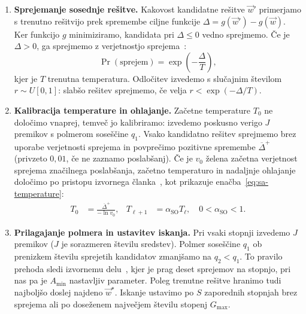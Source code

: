 \documentclass[9pt]{style/friteza}
\begin{document}
\begin{enumerate}
    \item \textbf{Sprejemanje sosednje rešitve.}
    Kakovost kandidatne rešitve $\vec{w}'$ primerjamo s trenutno rešitvijo prek spremembe ciljne funkcije $\Delta=g(\vec{w}')-g(\vec{w})$. Ker funkcijo $g$ minimiziramo, kandidata pri $\Delta\leq0$ vedno sprejmemo. Če je $\Delta>0$, ga sprejmemo z verjetnostjo sprejema~\cite{kirkpatrick1983}:
    \begin{equation}
    \label{eq:sa-accept}
    \Pr(\text{sprejem})
    =
    \exp\left(-\frac{\Delta}{T}\right),
    \end{equation}
    kjer je $T$ trenutna temperatura. Odločitev izvedemo s slučajnim številom $r\sim U[0,1]$: slabšo rešitev sprejmemo, če velja $r<\exp(-\Delta/T)$.

    \item \textbf{Kalibracija temperature in ohlajanje.}
    Začetne temperature $T_0$ ne določimo vnaprej, temveč jo kalibriramo: izvedemo poskusno verigo $J$ premikov s polmerom soseščine $q_1$. Vsako kandidatno rešitev sprejmemo brez uporabe verjetnosti sprejema in povprečimo pozitivne spremembe $\overline{\Delta}^{+}$ (privzeto $0{,}01$, če ne zaznamo poslabšanj). Če je $v_0$ želena začetna verjetnost sprejema značilnega poslabšanja, začetno temperaturo in nadaljnje ohlajanje določimo po pristopu izvornega članka~\cite{cramaschyns2003}, kot prikazuje enačba~\eqref{eq:sa-temperature}:
    \begin{equation}
    \label{eq:sa-temperature}
    \begin{aligned}
    T_0
    &=
    \frac{\overline{\Delta}^{+}}
         {-\ln v_0},
    &
    T_{\ell+1}
    &=
    \alpha_{\mathrm{SO}}T_\ell,
    \quad
    0<\alpha_{\mathrm{SO}}<1.
    \end{aligned}
    \end{equation}

    \item \textbf{Prilagajanje polmera in ustavitev iskanja.}
    Pri vsaki stopnji izvedemo $J$ premikov ($J$ je sorazmeren številu sredstev). Polmer soseščine $q_1$ ob prenizkem številu sprejetih kandidatov zmanjšamo na $q_2<q_1$. To pravilo prehoda sledi izvornemu delu~\cite{cramaschyns2003}, kjer je prag deset sprejemov na stopnjo, pri nas pa je $A_{\min}$ nastavljiv parameter. Poleg trenutne rešitve hranimo tudi najboljšo doslej najdeno $\vec{w}^{\star}$. Iskanje ustavimo po $S$ zaporednih stopnjah brez sprejema ali po doseženem največjem številu stopenj $G_{\max}$.
\end{enumerate}
\end{document}

